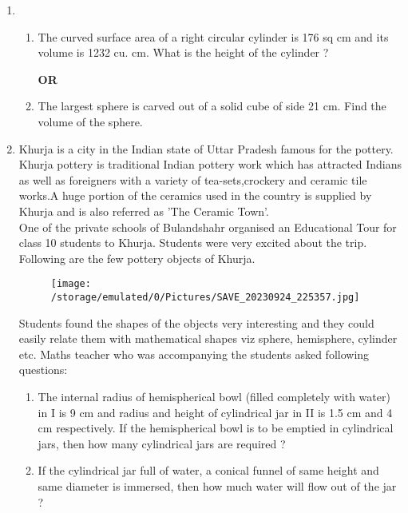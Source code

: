 \documentclass[12pt]{article}
\begin{document}
\begin{enumerate}
        \item \begin{enumerate}
       
          \item The curved surface area of a right circular cylinder is 176 sq cm and its volume is 1232 cu. cm. What is the  height of the cylinder ?
             \begin{center}
             \textbf{OR}
             \end{center}
             \item The largest sphere is carved out of a solid cube of side 21 cm. Find the volume of the sphere.
        \end{enumerate}
       
       
        \item Khurja is a city in the Indian state of Uttar Pradesh famous for the pottery. Khurja pottery is traditional Indian pottery work which has attracted Indians as well as foreigners with a variety of tea-sets,crockery and ceramic tile works.A huge portion of the ceramics used in the country is supplied by Khurja and is also referred as 'The Ceramic Town'.\\

        One of the private schools of Bulandshahr organised an Educational Tour for class 10 students to Khurja. Students were very excited about the trip. Following  are the few pottery objects of Khurja.\\
     
      \begin{figure}[ht]
            \centering
              \texttt{[image: /storage/emulated/0/Pictures/SAVE\_20230924\_225357.jpg]}
            \caption{}
            \label{}
        \end{figure}
        Students found the shapes of the objects very interesting and they could easily relate them with mathematical shapes viz sphere, hemisphere, cylinder etc. Maths teacher who was accompanying the students asked following questions:
       \begin{enumerate}
           \item The internal radius of hemispherical bowl (filled completely with water) in I is 9 cm and radius and height of cylindrical jar in II is 1.5 cm and 4 cm respectively. If the hemispherical bowl is to be emptied in cylindrical jars, then how many cylindrical jars are required ?
           \item If the cylindrical jar full of water, a conical funnel of same height and same diameter is immersed, then how much water will flow out of the jar ?
       \end{enumerate}
   

\end{enumerate}
\end{document}
